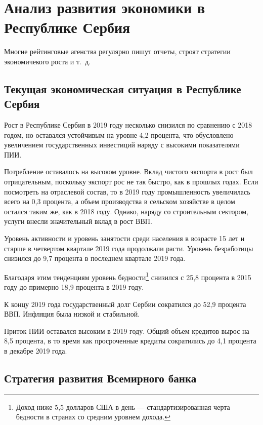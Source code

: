 \chapter{Анализ развития экономики в Республике Сербия}
\label{cha:analys}

Многие рейтинговые агенства регулярно пишут отчеты, строят стратегии экономичекого роста и т.~д.

\section{Текущая экономическая ситуация в Республике Сербия}

Рост в Республике Сербия в 2019 году несколько снизился по сравнению с 2018 годом, но оставался устойчивым на уровне 4,2 процента, что обусловлено увеличением государственных инвестиций наряду с высокими показателями ПИИ.

Потребление оставалось на высоком уровне.
Вклад чистого экспорта в рост был отрицательным, поскольку экспорт рос не так быстро, как в прошлых годах.
Если посмотреть на отраслевой состав, то в 2019 году промышленность увеличилась всего на 0,3 процента, а объем производства в сельском хозяйстве в целом остался таким же, как в 2018 году.
Однако, наряду со строительным сектором, услуги внесли значительный вклад в рост ВВП.

Уровень активности и уровень занятости среди населения в возрасте 15 лет и старше в четвертом квартале 2019 года продолжали расти.
Уровень безработицы снизился до 9,7 процента в последнем квартале 2019 года.

Благодаря этим тенденциям уровень бедности\footnote{Доход ниже 5,5 долларов США в день --- стандартизированная черта бедности в странах со средним уровнем дохода.} снизился с 25,8 процента в 2015 году до примерно 18,9 процента в 2019 году.

К концу 2019 года государственный долг Сербии сократился до 52,9 процента ВВП.
Инфляция была низкой и стабильной.

Приток ПИИ оставался высоким в 2019 году.
Общий объем кредитов вырос на 8,5 процента, в то время как просроченные кредиты сократились до 4,1 процента в декабре 2019 года.

\section{Стратегия развития Всемирного банка}

